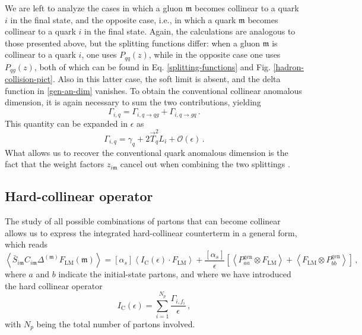 \documentclass[a4paper, 12pt]{book}
\newcommand{\um}{\mathfrak{m}}
\begin{document}
We are left to analyze the cases in which a gluon $\um$ becomes collinear to a quark $i$ in the final state, and the opposite case, i.e., in which a quark $\um$ becomes collinear to a quark $i$ in the final state. Again, the calculations are analogous to those presented above, but the splitting functions differ: when a gluon $\um$ is collinear to a quark $i$, one uses $P_{qq}(z)$, while in the opposite case one uses $P_{qg}(z)$, both of which can be found in Eq. \ref{splitting-functions} and Fig. \ref{hadron-collision-pict}. Also in this latter case, the soft limit is absent, and the delta function in \ref{gen-an-dim} vanishes. To obtain the conventional collinear anomalous dimension, it is again necessary to sum the two contributions, yielding
\begin{equation}
  \Gamma_{i,q} = \Gamma_{i,q \to qg} + \Gamma_{i,q \to gq} \,.
  \label{an-dim-quark}
\end{equation}
This quantity can be expanded  in $\epsilon$ as 
\begin{equation}
  \Gamma_{i,q} = \gamma_q+ 2 \vec{T}_q^2 L_i + \mathcal{O}(\epsilon) \,. 
  \label{expansion-an-dim-quark}
\end{equation}
What allows us to recover the conventional quark anomalous dimension is the fact that the weight factors $z_{i\um}$ cancel out when combining the two splittings \cite{Devoto:2025kin}. 


\subsection{Hard-collinear operator}
The study of all possible combinations of partons that can become collinear allows us to express the integrated hard-collinear counterterm in a general form, which reads
\begin{equation}
  \left< \bar{S}_{i\um} C_{i\um} \Delta^{(\um)} F_{\mathrm{LM}}(\um)\right> = [\alpha_s] \left< I_{\mathrm{C}}(\epsilon) \cdot F_{\mathrm{LM}} \right> + \frac{[\alpha_s]}{\epsilon} \left[\left< P_{aa}^{\mathrm{gen}} \otimes F_{\mathrm{LM}} \right> + \left< F_{\mathrm{LM}} \otimes P_{bb}^{\mathrm{gen}}  \right>\right] \, , 
  \label{soft-collinear-integrated}
\end{equation}
where $a$ and $b$  indicate the initial-state partons, and where we have introduced the hard collinear operator
\begin{equation}
  I_{\mathrm{C}}(\epsilon) = \sum_{i=1}^{N_p} \frac{\Gamma_{i,f_i}}{\epsilon}  \, ,
  \label{IC-def}
\end{equation}
with $N_p$  being the total number of partons involved.
\end{document}
